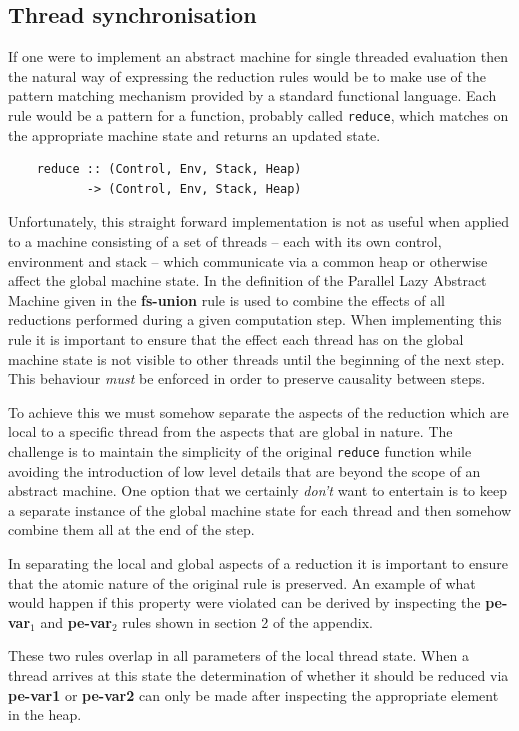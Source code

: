 \documentclass{llncs}
\begin{document}
\subsection{Thread synchronisation}
If one were to implement an abstract machine for single threaded evaluation then the natural way of expressing the reduction rules would be to make use of the pattern matching mechanism provided by a standard functional language. Each rule would be a pattern for a function, probably called \texttt{reduce}, which matches on the appropriate machine state and returns an updated state.

\begin{verbatim}
    reduce :: (Control, Env, Stack, Heap) 
           -> (Control, Env, Stack, Heap)
\end{verbatim}

\noindent
Unfortunately, this straight forward implementation is not as useful when applied to a machine consisting of a set of threads -- each with its own control, environment and stack -- which communicate via a common heap or otherwise affect the global machine state. In the definition of the Parallel Lazy Abstract Machine given in \cite{baker-finch:sfp99} the \textbf{fs-union} rule is used to combine the effects of all reductions performed during a given computation step. When implementing this rule it is important to ensure that the effect each thread has on the global machine state is not visible to other threads until the beginning of the next step. This behaviour \emph{must} be enforced in order to preserve causality between steps.

To achieve this we must somehow separate the aspects of the reduction which are local to a specific thread from the aspects that are global in nature. The challenge is to maintain the simplicity of the original \texttt{reduce} function while avoiding the introduction of low level details that are beyond the scope of an abstract machine. One option that we certainly \emph{don't} want to entertain is to keep a separate instance of the global machine state for each thread and then somehow combine them all at the end of the step.

In separating the local and global aspects of a reduction it is important to ensure that the atomic nature of the original rule is preserved. An example of what would happen if this property were violated can be derived by inspecting the \textbf{pe-var$_1$} and \textbf{pe-var$_2$} rules shown in section 2 of the appendix.

These two rules overlap in all parameters of the local thread state. When a thread arrives at this state the determination of whether it should be reduced via \textbf{pe-var1} or \textbf{pe-var2} can only be made after inspecting the appropriate element in the heap. 
\end{document}
